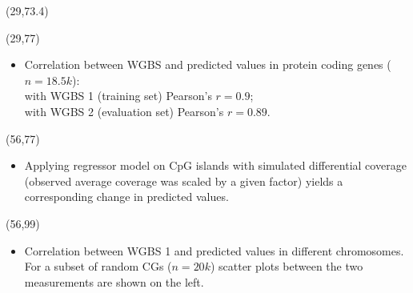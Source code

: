 \documentclass[a0,50pt]{a0poster}
\def\SectionTitle#1{\noindent{\huge\color{fontMain2} #1}}
\begin{document}
    \begin{textblock}{25}(29,73.4)
        \SectionTitle{Results}
    \end{textblock}

    \begin{textblock}{25}(29,77)
        \Large
        \begin{itemize}
            \item Correlation between WGBS and predicted values in protein coding genes ($n = 18.5k$):\\
            with WGBS 1 (training set) Pearson's $r = 0.9$; \\ with WGBS 2 (evaluation set) Pearson's $r = 0.89$.
        \end{itemize}
    \end{textblock}

    \begin{textblock}{25}(56,77)
        \Large
        \begin{itemize}
            \item Applying regressor model on CpG islands with simulated differential coverage (observed average coverage was scaled by a given factor) yields a corresponding change in predicted values.
        \end{itemize}
    \end{textblock}

    \begin{textblock}{25}(56,99)
        \Large
        \begin{itemize}
            \item Correlation between WGBS 1 and predicted values in different chromosomes. For a subset of random CGs ($n = 20k$) scatter plots between the two measurements are shown on the left.
        \end{itemize}
    \end{textblock}
\end{document}
